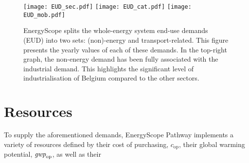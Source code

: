 \begin{figure}[htbp!]
\centering
\texttt{[image: EUD\_sec.pdf]}
\texttt{[image: EUD\_cat.pdf]}
\texttt{[image: EUD\_mob.pdf]}
\caption{EnergyScope splits the whole-energy system end-use demands (EUD) into two sets: (non)-energy and transport-related. This figure presents the yearly values of each of these demands. In the top-right graph, the non-energy demand has been fully associated with the industrial demand. This highlights the significant level of industrialisation of Belgium compared to the other sectors.}
\label{fig:cs_demands}
\end{figure}


\section{Resources}
\label{sec:cs:resources}
To supply the aforementioned demands, EnergyScope Pathway implements a variety of resources defined by their cost of purchasing, $\mathit{c}_{\mathrm{op}}$, their global warming potential, $\emph{gwp}_{\mathrm{op}}$, as well as their 
